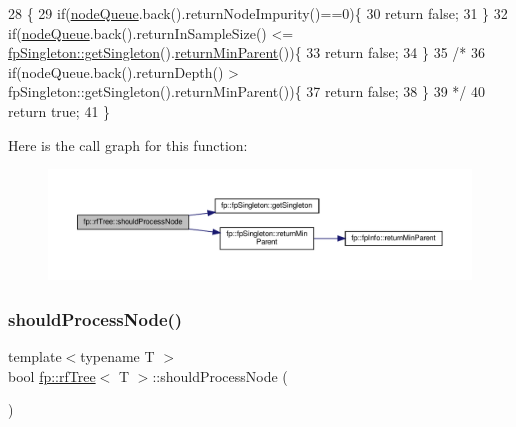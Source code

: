 \begin{DoxyCode}
28                                                \{
29                     \textcolor{keywordflow}{if}(\hyperlink{classfp_1_1rfTree_af72d0a2f930fd480dfb4858885c2df23}{nodeQueue}.back().returnNodeImpurity()==0)\{
30                         \textcolor{keywordflow}{return} \textcolor{keyword}{false};
31                     \}
32                     \textcolor{keywordflow}{if}(\hyperlink{classfp_1_1rfTree_af72d0a2f930fd480dfb4858885c2df23}{nodeQueue}.back().returnInSampleSize() <= 
      \hyperlink{classfp_1_1fpSingleton_a8bdae77b68521003e3fc630edec2e240}{fpSingleton::getSingleton}().\hyperlink{classfp_1_1fpSingleton_a2d06406b6462099e0adb393218090420}{returnMinParent}())\{
33                         \textcolor{keywordflow}{return} \textcolor{keyword}{false};
34                     \}
35                     \textcolor{comment}{/*}
36 \textcolor{comment}{                         if(nodeQueue.back().returnDepth() >
       fpSingleton::getSingleton().returnMinParent())\{}
37 \textcolor{comment}{                         return false;}
38 \textcolor{comment}{                         \}}
39 \textcolor{comment}{                         */}
40                     \textcolor{keywordflow}{return} \textcolor{keyword}{true};
41                 \}
\end{DoxyCode}
Here is the call graph for this function\+:
\nopagebreak
\begin{figure}[H]
\begin{center}
\leavevmode
\includegraphics[width=350pt]{classfp_1_1rfTree_a36abf82d31ca57670b09da16525dce0d_cgraph}
\end{center}
\end{figure}
\mbox{\label{classfp_1_1rfTree_a36abf82d31ca57670b09da16525dce0d}} 
\subsubsection{\texorpdfstring{should\+Process\+Node()}{shouldProcessNode()}\hspace{0.1cm}{\footnotesize\ttfamily [2/2]}}
{\footnotesize\ttfamily template$<$typename T $>$ \\
bool \hyperlink{classfp_1_1rfTree}{fp\+::rf\+Tree}$<$ T $>$\+::should\+Process\+Node (\begin{DoxyParamCaption}{ }\end{DoxyParamCaption})\hspace{0.3cm}{\ttfamily [inline]}}



